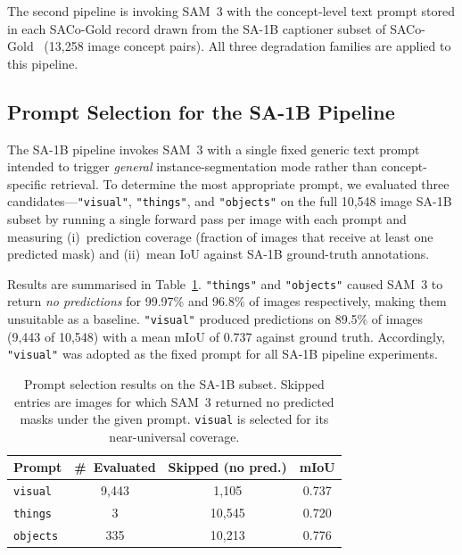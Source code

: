 \documentclass[10pt,twocolumn,letterpaper]{article}
\begin{document}
The second pipeline is invoking SAM~3 with the concept-level text prompt stored in each SACo-Gold record drawn from the SA-1B captioner subset of SACo-Gold~\cite{meta2025saco} (13,258 image concept
pairs). All three degradation families are applied to this pipeline.
\subsection{Prompt Selection for the SA-1B Pipeline}
\label{sec:prompt-selection}

The SA-1B pipeline invokes SAM~3 with a single fixed generic text prompt
intended to trigger \emph{general} instance-segmentation mode rather than concept-specific retrieval.  To determine the most appropriate prompt, we evaluated three candidates---\texttt{"visual"}, \texttt{"things"}, and \texttt{"objects"} on the full 10,548 image SA-1B subset by running a single forward pass per image with each prompt and measuring (i)~prediction coverage (fraction of images that receive at least one predicted mask) and (ii)~mean IoU against SA-1B ground-truth annotations.

Results are summarised in Table~\ref{tab:prompt-selection}.
\texttt{"things"} and \texttt{"objects"} caused SAM~3 to return \emph{no
predictions} for 99.97\% and 96.8\% of images respectively, making them
unsuitable as a baseline.  \texttt{"visual"} produced predictions on
89.5\% of images (9,443 of 10,548) with a mean mIoU of 0.737 against
ground truth.  Accordingly, \texttt{"visual"} was adopted as the fixed
prompt for all SA-1B pipeline experiments.

\begin{table}[h]
\centering
\small
\begin{tabular}{lccc}
\hline
Prompt & \#~Evaluated & Skipped (no pred.) & mIoU \\
\hline
\texttt{visual}  & 9{,}443 &  1{,}105 & 0.737 \\
\texttt{things}  &       3 & 10{,}545 & 0.720 \\
\texttt{objects} &     335 & 10{,}213 & 0.776 \\
\hline
\end{tabular}
\vspace{3 pt}
\caption{Prompt selection results on the SA-1B subset.
         Skipped entries are images for which SAM~3 returned no predicted
         masks under the given prompt.  \texttt{visual} is selected for
         its near-universal coverage.}
\label{tab:prompt-selection}
\end{table}
\end{document}
